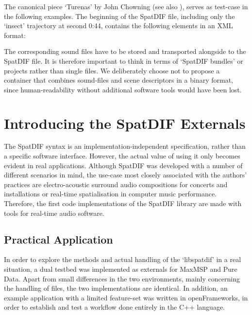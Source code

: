 \documentclass{article}
\begin{document}
The canonical piece `Turenas' by John Chowning (see also \cite{Peters:2013SpatDifCMJ}), serves as test-case in the following examples. 
The beginning of the SpatDIF file, including only the `insect' trajectory at second 0:44, contains the following elements in an XML format:

 

The corresponding sound files have to be stored and transported alongside to the SpatDIF file.
It is therefore important to think in terms of ‘SpatDIF bundles’ or projects rather than single files. 
We deliberately choose not to propose a container that combines sound-files and scene descriptors in a binary format, since human-readability without additional software tools would have been lost. 

\section{Introducing the SpatDIF Externals}\label{sec:Intro}

The SpatDIF syntax is an implementation-independent specification, rather than a specific software interface. 
However, the actual value of using it only becomes evident in real applications. 
Although SpatDIF was developed with a number of different scenarios in mind, the use-case most closely associated with the authors' practices are electro-acoustic surround audio compositions for concerts and installations or real-time spatialisation in computer music performance.
Therefore, the first code implementations of the SpatDIF library are made with tools for real-time audio software.

\subsection{Practical Application}\label{practical_usage}

In order to explore the methods and actual handling of the `libspatdif' in a real situation, a dual testbed was implemented as externals for MaxMSP and Pure Data.
Apart from small differences in the two environments, mainly concerning the handling of files, the two implementations are identical.
In addition, an example application with a limited feature-set was written in openFrameworks, in order to establish and test a workflow done entirely in the C++ language.
\end{document}
